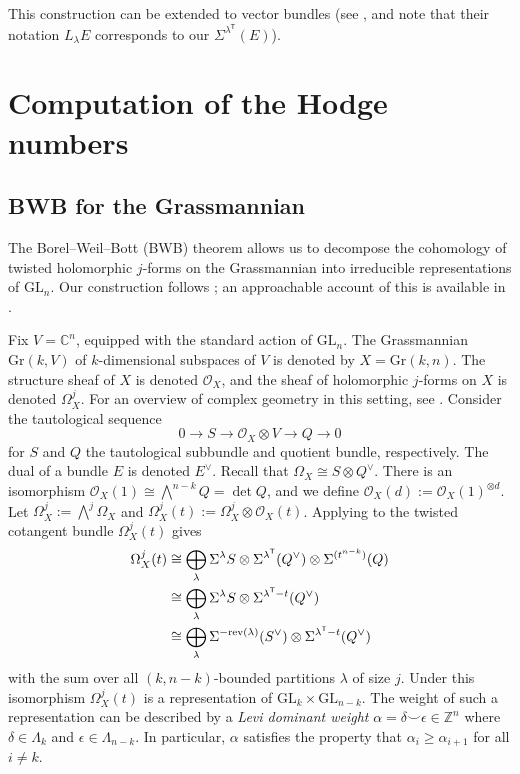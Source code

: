 \documentclass{amsart}
\newcommand\T{\mathsf{T}}
\newcommand\GL{\mathrm{GL}}
\newcommand\Z{\mathbb{Z}}
\theoremstyle{plain}
\theoremstyle{definition}
\numberwithin{equation}{section}
\begin{document}
This construction can be extended to vector bundles (see \cite{Wey03}, and note that their notation $L_{\lambda}E$ corresponds to our $\Sigma^{\lambda^\T}(E)$).

\section{Computation of the Hodge numbers}\label{sec:hodge-formula}

\subsection{BWB for the Grassmannian}\label{sec:BWB}

The Borel--Weil--Bott (BWB) theorem allows us to decompose the cohomology of twisted holomorphic $j$-forms on the Grassmannian into irreducible representations of $\GL_n$. Our construction follows \cite[\S4.1]{Wey03}; an approachable account of this is available in \cite[Theorem A.9]{Nik25}.


Fix $V=\mathbb C^n$, equipped with the standard action of $\mathrm{GL}_n$. The Grassmannian $\mathrm{Gr}(k,V)$ of $k$-dimensional subspaces of $V$ is denoted by $X=\mathrm{Gr}(k,n)$. The structure sheaf of $X$ is denoted $\mathcal O_X$, and the sheaf of holomorphic $j$-forms on $X$ is denoted $\Omega_X^j$. For an overview of complex geometry in this setting, see \cite[\S10.1.1]{Voi01}. Consider the tautological sequence 
\begin{equation*}
0\to S\to \mathcal O_X\otimes V\to Q\to 0
\end{equation*}
for $S$ and $Q$ the tautological subbundle and quotient bundle, respectively. The dual of a bundle $E$ is denoted $E^\vee$. Recall that $\Omega_X\cong S\otimes Q^\vee$. There is an isomorphism $\mathcal O_X(1)\cong\bigwedge^{n-k} Q= \det Q$, and we define $\mathcal O_X(d):=\mathcal O_X(1)^{\otimes d}$. Let $\Omega_X^j := \bigwedge^j \Omega_X
$ and $\Omega_X^j(t):= \Omega_X^j\otimes \mathcal O_X(t)$. Applying  to the twisted cotangent bundle $\Omega_X^j(t)$ gives
\begin{align}\label{thm:wedge of product omega}\Omega^{j}_{X}(t)&\cong \bigoplus_{\lambda} \Sigma^{\lambda} S\otimes \Sigma^{\lambda^\T}(Q^\vee)\otimes \Sigma^{(t^{n-k})}(Q)\\
    &\cong \bigoplus_{\lambda} \Sigma^{\lambda} S\otimes \Sigma^{\lambda^\T-t} (Q^\vee)\notag\\
    &\cong \bigoplus_{\lambda} \Sigma^{-\mathrm{rev}(\lambda) } (S^\vee)\otimes \Sigma^{\lambda^\T-t} (Q^\vee)\notag
\end{align}
with the sum over all $(k,n-k)$-bounded partitions $\lambda$ of size $j$. Under this isomorphism $\Omega_X^j(t)$ is a representation of $\GL_k\times\GL_{n-k}$. The weight of such a representation can be described by a \emph{Levi dominant weight} $\alpha=\delta\smile\epsilon\in\Z^n$ where $\delta\in\Lambda_k$ and $\epsilon\in\Lambda_{n-k}$. In particular, $\alpha$ satisfies the property that $\alpha_i\geq\alpha_{i+1}$ for all $i\neq k$.
\end{document}

